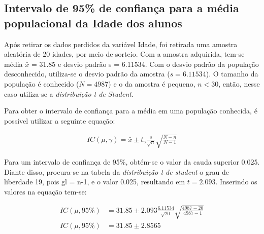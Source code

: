 \subsection{Intervalo de 95\% de confiança para a média populacional da Idade dos alunos}
\label{sub:1a}
	
	Após retirar os dados perdidos da variável Idade, foi retirada uma
	amostra aleatória de 20 idades, por meio de sorteio. Com a amostra
	adquirida, tem-se média $\bar{x}$ = \num{31,85} e desvio padrão s = \num{6,11534}.
	Com o desvio padrão da população desconhecido, utiliza-se o desvio
	padrão da amostra ($s = \num{6,11534}$).  O tamanho da população é conhecido ($N
	= 4987$) e o da amostra é pequeno, $n < 30$, então, nesse caso utiliza-se
	a \textit{distribuição t de Student}.

	Para obter o intervalo de confiança para a média em uma população
	conhecida, é possível utilizar a seguinte equação:

	
	\begin{align}
		\label{eq:dois-a-expr}
		IC (\mu, \gamma) = \bar{x} \pm t_\gamma \frac{s}{\sqrt{n}} \sqrt{\frac{N-n}{N-1}}
	\end{align}

	Para um intervalo de confiança de 95\%, obtém-se o valor da cauda
	superior \num{0,025}. Diante disso, procura-se na tabela da \textit{distribuição
	t de student} o grau de liberdade 19, pois gl = n-1, e o valor \num{0,025},
	resultando em $t = \num{2,093}$. Inserindo os valores na equação
	tem-se:

	\begin{align*}
		IC (\mu, 95\%) &= \num{31,85} \pm \num{2,093} \frac{\num{6,11534}}{\sqrt{20}} \sqrt{\frac{4987 - 20}{4987 - 1}} \\
		IC (\mu, 95\%) &= \num{31,85} \pm \num{2,8565}
	\end{align*}

